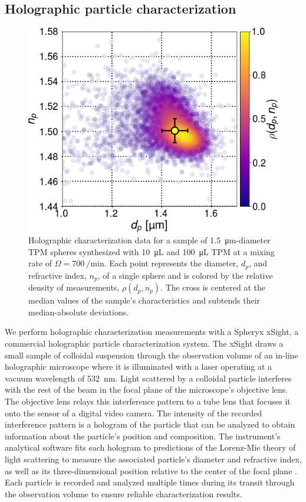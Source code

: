 \documentclass[journal=langd5,manuscript=article,layout=twocolumn]{achemso}
\begin{document}
\subsection{Holographic particle characterization}
\label{sec:holographicparticlecharacterization}

\begin{figure}
    \centering
    \includegraphics[width=\columnwidth]{distribution03.png}
    \caption{Holographic characterization data for a sample
    of \SI{1.5}{\um}-diameter TPM spheres synthesized with
    \SI{10}{\micro\liter}  and 
    \SI{100}{\micro\liter} TPM at a mixing rate
    of $\Omega = \SI{700}{\per\minute}$.  Each point
    represents the diameter, $d_p$, and refractive index,
    $n_p$, of a single sphere and is colored by the relative
    density of measurements, $\rho(d_p, n_p)$.
    The cross is centered at the median values of the sample's
    characteristics and subtends their 
    median-absolute deviations.}
    \label{fig:typicalcharacterization}
\end{figure}

We perform holographic characterization measurements with a Spheryx xSight,
a commercial holographic particle characterization system.
The xSight draws a small sample of colloidal suspension through the
observation volume of an in-line holographic microscope where it is illuminated
with a laser operating at a vacuum wavelength of \SI{532}{\nm}.
Light scattered by a colloidal particle interferes with the rest of the
beam in the focal plane of the microscope's objective lens.
The objective lens relays this interference pattern to a tube
lens that focuses it onto the sensor of a digital video camera.
The intensity of the recorded interference pattern is
a hologram of the particle that can be analyzed to obtain information
about the particle's position and composition.
The instrument's analytical software fits each hologram 
to predictions of the Lorenz-Mie theory of light scattering
to measure the associated particle's diameter and refractive index, as well as its
three-dimensional position relative to the center of the 
focal plane \cite{lee07a}.
Each particle is recorded and analyzed multiple times during its
transit through the observation volume to ensure reliable characterization
results.
\end{document}
